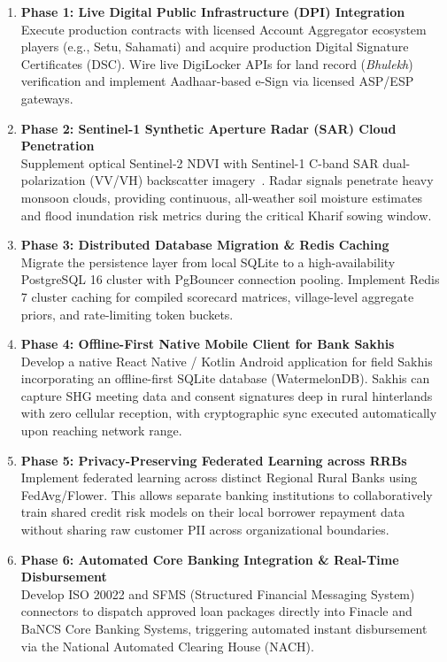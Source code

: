 \documentclass[11pt,a4paper,oneside]{report}
\begin{document}
\begin{enumerate}
  \item \textbf{Phase 1: Live Digital Public Infrastructure (DPI) Integration}\\
  Execute production contracts with licensed Account Aggregator ecosystem players (e.g., Setu, Sahamati) and acquire production Digital Signature Certificates (DSC). Wire live DigiLocker APIs for land record (\textit{Bhulekh}) verification and implement Aadhaar-based e-Sign via licensed ASP/ESP gateways.

  \item \textbf{Phase 2: Sentinel-1 Synthetic Aperture Radar (SAR) Cloud Penetration}\\
  Supplement optical Sentinel-2 NDVI with Sentinel-1 C-band SAR dual-polarization (VV/VH) backscatter imagery~\cite{drusch_sentinel2_2012}. Radar signals penetrate heavy monsoon clouds, providing continuous, all-weather soil moisture estimates and flood inundation risk metrics during the critical Kharif sowing window.

  \item \textbf{Phase 3: Distributed Database Migration \& Redis Caching}\\
  Migrate the persistence layer from local SQLite to a high-availability PostgreSQL 16 cluster with PgBouncer connection pooling. Implement Redis 7 cluster caching for compiled scorecard matrices, village-level aggregate priors, and rate-limiting token buckets.

  \item \textbf{Phase 4: Offline-First Native Mobile Client for Bank Sakhis}\\
  Develop a native React Native / Kotlin Android application for field Sakhis incorporating an offline-first SQLite database (WatermelonDB). Sakhis can capture SHG meeting data and consent signatures deep in rural hinterlands with zero cellular reception, with cryptographic sync executed automatically upon reaching network range.

  \item \textbf{Phase 5: Privacy-Preserving Federated Learning across RRBs}\\
  Implement federated learning across distinct Regional Rural Banks using FedAvg/Flower. This allows separate banking institutions to collaboratively train shared credit risk models on their local borrower repayment data without sharing raw customer PII across organizational boundaries.

  \item \textbf{Phase 6: Automated Core Banking Integration \& Real-Time Disbursement}\\
  Develop ISO 20022 and SFMS (Structured Financial Messaging System) connectors to dispatch approved loan packages directly into Finacle and BaNCS Core Banking Systems, triggering automated instant disbursement via the National Automated Clearing House (NACH).
\end{enumerate}
\end{document}
